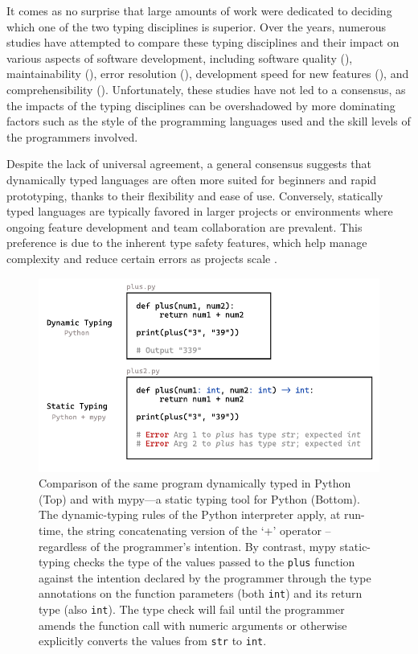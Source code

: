 It comes as no surprise that large amounts of work were dedicated to deciding which one of the two typing disciplines is superior. Over the years, numerous studies have attempted to compare these typing disciplines and their impact on various aspects of software development, including software quality (\cite{Ray2017-gq, Gao2017-xn}), maintainability (\cite{Kleinschmager2012-bg}), error resolution (\cite{Prechelt1998-pd}), development speed for new features (\cite{Prechelt2000-bf, Mayer2012-ko}), and comprehensibility (\cite{Endrikat2014-uz}). Unfortunately, these studies have not led to a consensus, as the impacts of the typing disciplines can be overshadowed by more dominating factors such as the style of the programming languages used and the skill levels of the programmers involved.

Despite the lack of universal agreement, a general consensus suggests that dynamically typed languages are often more suited for beginners and rapid prototyping, thanks to their flexibility and ease of use. Conversely, statically typed languages are typically favored in larger projects or environments where ongoing feature development and team collaboration are prevalent. This preference is due to the inherent type safety features, which help manage complexity and reduce certain errors as projects scale \cite{Chatley2019-uq}.


\begin{figure}[]
  \includegraphics[width=\linewidth]{TypedVsUntyped.pdf}
  \caption[Comparison of the same program dynamically typed in Python and with mypy—a static typing tool for Python]{
    \label{fig:typed-vs-untyped}
    Comparison of the same program dynamically typed in Python (Top) and with mypy—a static typing tool for Python (Bottom).  The dynamic-typing rules of the Python interpreter apply, at run-time, the string concatenating version of the `+' operator -- regardless of the programmer's intention.  By contrast, mypy static-typing checks the type of the values passed to the {\tt plus} function against the intention declared by the programmer through the type annotations on the function parameters (both {\tt int}) and its return type (also {\tt int}).  The type check will fail until the programmer amends the function call with numeric arguments or otherwise explicitly converts the values from {\tt str} to {\tt int}.
    }
\end{figure}



